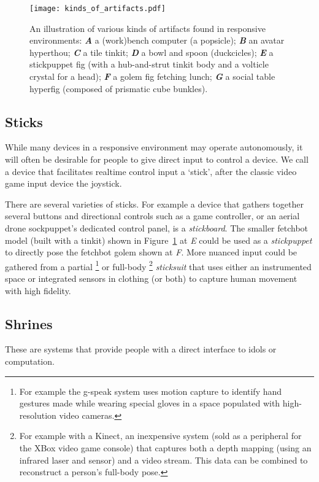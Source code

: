 \begin{figure}[]
  \centering
    \texttt{[image: kinds\_of\_artifacts.pdf]}
  \caption{An illustration of various kinds of artifacts found in responsive environments: \textbf{\emph{A}} a (work)bench computer (a popsicle); \textbf{\emph{B}} an avatar hyperthou; \textbf{\emph{C}} a tile tinkit; \textbf{\emph{D}} a bowl and spoon (duckcicles); \textbf{\emph{E}} a stickpuppet fig (with a hub-and-strut tinkit body and a volticle crystal for a head); \textbf{\emph{F}} a golem fig fetching lunch; \textbf{\emph{G}} a social table hyperfig (composed of prismatic cube bunkles).}
  \label{fig:kinds_of_artifacts}
\end{figure}

\subsection{Sticks}
%
While many devices in a responsive environment may operate autonomously, it will often be desirable for people to give direct input to control a device. 
We call a device that facilitates realtime control input a `stick', after the classic video game input device the joystick. 

There are several varieties of sticks. 
For example a device that gathers together several buttons and directional controls such as a game controller, or an aerial drone sockpuppet's dedicated control panel, is a \emph{stickboard}. 
The smaller fetchbot model (built with a tinkit) shown in Figure~\ref{fig:kinds_of_artifacts} at \emph{E} could be used as a \emph{stickpuppet} to directly pose the fetchbot golem shown at \emph{F}. 
More nuanced input could be gathered from a partial%
\footnote{For example the g-speak system \citep{gstalt} uses motion capture to identify hand gestures made while wearing special gloves in a space populated with high-resolution video cameras.}
or full-body%
\footnote{For example with a Kinect, an inexpensive system (sold as a peripheral for the XBox video game console) that captures both a depth mapping (using an infrared laser and sensor) and a video stream. This data can be combined to reconstruct a person's full-body pose.}
\emph{sticksuit} that uses either an instrumented space or integrated sensors in clothing (or both) to capture human movement with high fidelity.

\subsection{Shrines}
%
These are systems that provide people with a direct interface to idols or computation.

